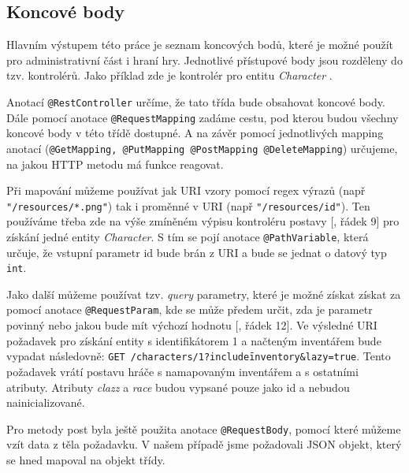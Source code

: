\subsection{Koncové body}\label{sec:impl:endpoints}
Hlavním výstupem této práce je seznam koncových bodů, které je možné použít pro administrativní část i hraní hry. Jednotlivé přístupové body jsou rozděleny do tzv. kontrolérů. Jako příklad zde je kontrolér pro entitu \textit{Character} . 


Anotací \texttt{@RestController} určíme, že tato třída bude obsahovat koncové body. Dále pomocí anotace \texttt{@RequestMapping} zadáme cestu, pod kterou budou všechny koncové body v této třídě dostupné. A na závěr pomocí jednotlivých mapping anotací (\texttt{@GetMapping, @PutMapping @PostMapping @DeleteMapping}) určujeme, na jakou HTTP metodu má funkce reagovat.

Při mapování můžeme používat jak URI vzory pomocí regex výrazů (např \texttt{"/resources/*.png"}) tak i proměnné v URI (např \texttt{"/resources/{id}"}). Ten používáme třeba zde na výše zmíněném výpisu kontroléru postavy [, řádek 9] pro získání jedné entity \textit{Character}. S tím se pojí anotace \texttt{@PathVariable}, která určuje, že vstupní parametr id bude brán z URI a bude se jednat o datový typ \texttt{int}.

Jako další můžeme používat tzv. \textit{query} parametry, které je možné získat získat za pomocí anotace \texttt{@RequestParam}, kde se může předem určit, zda je parametr povinný nebo jakou bude mít výchozí hodnotu [, řádek 12]. Ve výsledné URI požadavek pro získání entity s identifikátorem 1 a načteným inventářem bude vypadat následovně: \texttt{GET /characters/1?include\=inventory\&lazy=true}. Tento požadavek vrátí postavu hráče s namapovaným inventářem a s ostatními atributy. Atributy \textit{clazz} a \textit{race} %
budou vypsané pouze jako id a nebudou nainicializované.

Pro metody post byla ještě použita anotace \texttt{@RequestBody}, pomocí které můžeme vzít data z těla požadavku. V našem případě jsme požadovali JSON objekt, který se hned mapoval na objekt třídy.

